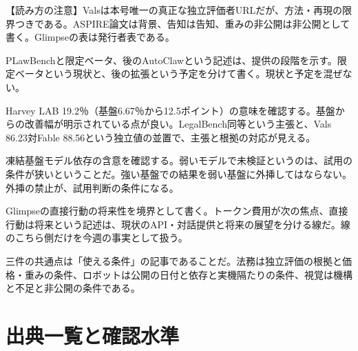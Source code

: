 \documentclass[lualatex,a4paper,10pt]{jlreq}
\begin{document}

\begin{tcolorbox}[colback=SurveySoft,colframe=SurveyRule,arc=1mm,boxrule=0.4pt,left=2mm,right=2mm]
【読み方の注意】Valsは本号唯一の真正な独立評価者URLだが、方法・再現の限界つきである。ASPIRE論文は背景、告知は告知、重みの非公開は非公開として書く。Glimpseの表は発行者表である。
\end{tcolorbox}
\cite{B55,B53,B54,B57,B56,B58,B59,B88}

PLawBenchと限定ベータ、後のAutoClawという記述は、提供の段階を示す。限定ベータという現状と、後の拡張という予定を分けて書く。現状と予定を混ぜない。
\cite{B55,B53,B54}


Harvey LAB 19.2％（基盤6.67％から12.5ポイント）の意味を確認する。基盤からの改善幅が明示されている点が良い。LegalBench同等という主張と、Vals 86.23対Fable 88.56という独立値の並置で、主張と根拠の対応が見える。
\cite{B55,B53,B54}


凍結基盤モデル依存の含意を確認する。弱いモデルで未検証というのは、試用の条件が狭いということだ。強い基盤での結果を弱い基盤に外挿してはならない。外挿の禁止が、試用判断の条件になる。
\cite{B57,B56}


Glimpseの直接行動の将来性を境界として書く。トークン費用が次の焦点、直接行動は将来という記述は、現状のAPI・対話提供と将来の展望を分ける線だ。線のこちら側だけを今週の事実として扱う。
\cite{B58,B59,B88}


三件の共通点は「使える条件」の記事であることだ。法務は独立評価の根拠と価格・重みの条件、ロボットは公開の日付と依存と実機隔たりの条件、視覚は機構と不足と非公開の条件である。
\cite{B55,B53,B54,B57,B56,B58,B59,B88}


\clearpage  %
\section*{出典一覧と確認水準}
\end{document}
